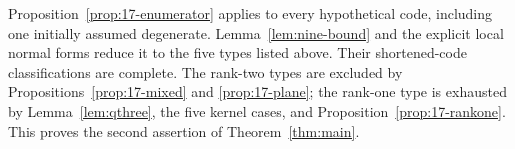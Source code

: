 Proposition~\ref{prop:17-enumerator} applies to every hypothetical code,
including one initially assumed degenerate. Lemma~\ref{lem:nine-bound}
and the explicit local normal forms reduce it to the five types listed
above. Their shortened-code classifications are complete. The rank-two types are
excluded by Propositions~\ref{prop:17-mixed} and \ref{prop:17-plane};
the rank-one type is exhausted by Lemma~\ref{lem:qthree}, the five kernel
cases, and Proposition~\ref{prop:17-rankone}.
This proves the second assertion of Theorem~\ref{thm:main}.

